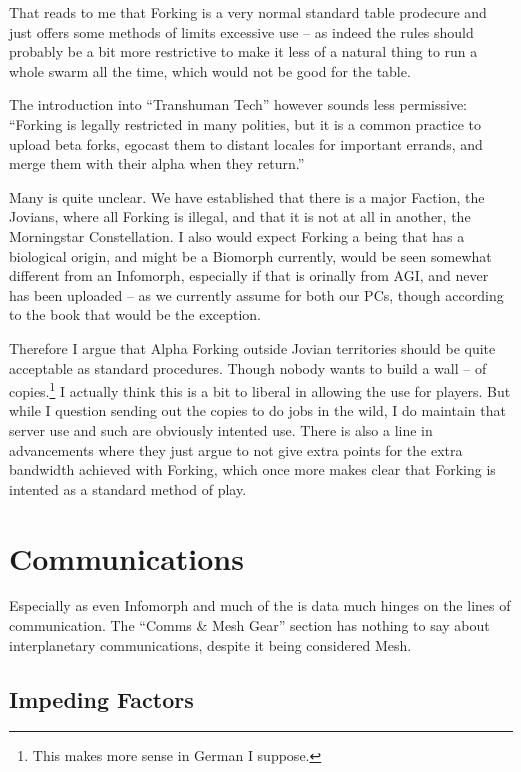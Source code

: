That reads to me that Forking is a very normal standard table prodecure and just offers some methods of limits excessive use -- as indeed the rules should probably be a bit more restrictive to make it less of a natural thing to run a whole swarm all the time, which would not be good for the table.

The introduction into “Transhuman Tech” however sounds less permissive: “Forking is legally restricted in many polities, but it is a common practice to upload beta forks, egocast them to distant locales for important errands, and merge them with their alpha when they return.” \citep[pg. 286]{ep2e_1.1_2019}

Many is quite unclear. We have established that there is a major Faction, the Jovians, where all Forking is illegal, and that it is not at all in another, the Morningstar Constellation. I also would expect Forking a being that has a biological origin, and might be a Biomorph currently, would be seen somewhat different from an Infomorph, especially if that is orinally from AGI, and never has been uploaded -- as we currently assume for both our PCs, though according to the book that would be the exception.

Therefore I argue that Alpha Forking outside Jovian territories should be quite acceptable as standard procedures. Though nobody wants to build a wall -- of copies.\footnote{This makes more sense in German I suppose.} I actually think this is a bit to liberal in allowing the use for players. But while I question sending out the copies to do jobs in the wild, I do maintain that server use and such are obviously intented use. There is also a line in advancements where they just argue to not give extra points for the extra bandwidth achieved with Forking, which once more makes clear that Forking is intented as a standard method of play.


\section{Communications}

Especially as even Infomorph and much of the  is data much hinges on the lines of communication. The “Comms \& Mesh Gear” section has nothing to say about interplanetary communications, despite it being considered Mesh.


\subsection{Impeding Factors}

